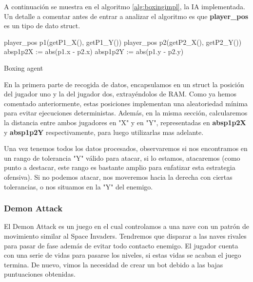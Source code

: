 A continuación se muestra en el algoritmo \ref{alg:boxingimpl}, la IA implementada. Un detalle a comentar antes de entrar a analizar el algoritmo es que \textbf{player\_pos} es un tipo de dato struct.

\begin{algorithm}[H]
	player\_pos p1(getP1\_X(), getP1\_Y())\;
	player\_pos p2(getP2\_X(), getP2\_Y())\;
	absp1p2X := abs(p1.x - p2.x)\;
	absp1p2Y := abs(p1.y - p2.y)\;
	
	\caption{Boxing agent}
	\label{alg:boxingimpl}
\end{algorithm}

En la primera parte de recogida de datos, encapsulamos en un struct la posición del jugador uno y la del jugador dos, extrayéndolos de RAM. Como ya hemos comentado anteriormente, estas posiciones implementan una aleatoriedad mínima para evitar ejecuciones deterministas. Además, en la misma sección, calcularemos la distancia entre ambos jugadores en "X" y en "Y", representadas en \textbf{absp1p2X} y \textbf{absp1p2Y} respectivamente, para luego utilizarlas mas adelante.

Una vez tenemos todos los datos procesados, observaremos si nos encontramos en un rango de tolerancia "Y" válido para atacar, si lo estamos, atacaremos (como punto a destacar, este rango es bastante amplio para enfatizar esta estrategia ofensiva). Si no podemos atacar, nos moveremos hacia la derecha  con ciertas tolerancias, o nos situamos en la "Y" del enemigo.


\subsubsection{Demon Attack}
\label{subsec:botsbasicos:da}
El Demon Attack es un juego en el cual controlamos a una nave con un patrón de movimiento similar al Space Invaders. Tendremos que disparar a las naves rivales para pasar de fase además de evitar todo contacto enemigo. El jugador cuenta con una serie de vidas para pasarse los niveles, si estas vidas se acaban el juego termina. De nuevo, vimos la necesidad de crear un bot debido a las bajas puntuaciones obtenidas.


